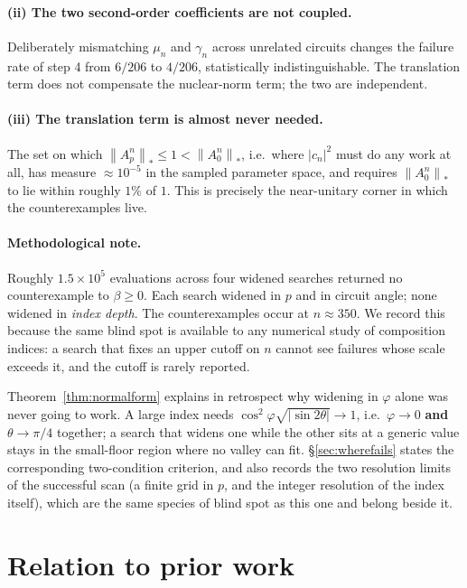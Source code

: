 \documentclass[11pt,a4paper]{article}
\theoremstyle{definition}
\theoremstyle{remark}
\newcommand{\nuc}[1]{\left\lVert #1 \right\rVert_{*}}
\begin{document}
\paragraph{(ii) The two second-order coefficients are not coupled.} Deliberately mismatching $\mu_n$ and $\gamma_n$ across unrelated circuits changes the failure rate of step 4 from $6/206$ to $4/206$, statistically indistinguishable. The translation term does not compensate the nuclear-norm term; the two are independent.

\paragraph{(iii) The translation term is almost never needed.} The set on which $\nuc{A_p^n} \le 1 < \nuc{A_0^n}$, i.e.\ where $|c_n|^2$ must do any work at all, has measure $\approx 10^{-5}$ in the sampled parameter space, and requires $\nuc{A_0^n}$ to lie within roughly $1\%$ of $1$. This is precisely the near-unitary corner in which the counterexamples live.

\paragraph{Methodological note.} Roughly $1.5\times10^5$ evaluations across four widened searches returned no counterexample to $\beta \ge 0$. Each search widened in $p$ and in circuit angle; none widened in \emph{index depth}. The counterexamples occur at $n \approx 350$. We record this because the same blind spot is available to any numerical study of composition indices: a search that fixes an upper cutoff on $n$ cannot see failures whose scale exceeds it, and the cutoff is rarely reported.

Theorem~\ref{thm:normalform} explains in retrospect why widening in $\varphi$ alone was never going to work. A large index needs $\cos^2\!\varphi\sqrt{|\sin2\theta|}\to1$, i.e.\ $\varphi\to0$ \textbf{and} $\theta\to\pi/4$ together; a search that widens one while the other sits at a generic value stays in the small-floor region where no valley can fit. \S\ref{sec:wherefails} states the corresponding two-condition criterion, and also records the two resolution limits of the successful scan (a finite grid in $p$, and the integer resolution of the index itself), which are the same species of blind spot as this one and belong beside it.

\section{Relation to prior work}\label{sec:park}\label{sec:priorwork}
\end{document}
